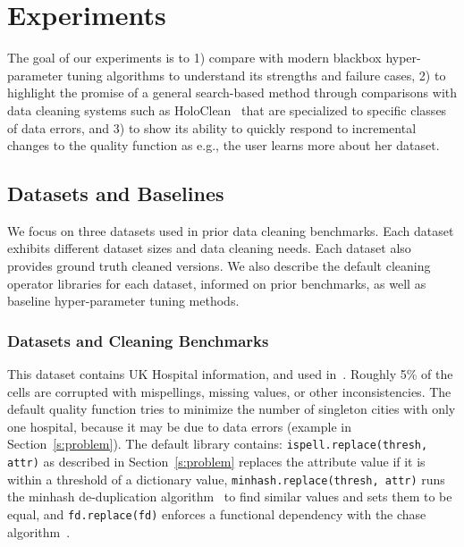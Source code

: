 \section{Experiments}\label{s:exp}
The goal of our experiments is to 1) compare \sys with modern blackbox hyper-parameter tuning algorithms to understand its strengths and failure cases, 2) to highlight the promise of a general search-based method through comparisons with data cleaning systems such as HoloClean~\cite{rekatsinas2017holoclean} that are specialized to specific classes of data errors, and 3) to show its ability to quickly respond to incremental changes to the quality function as e.g., the user learns more about her dataset.   




\subsection{Datasets and Baselines}
We focus on three datasets used in prior data cleaning benchmarks.  Each dataset exhibits different dataset sizes and data cleaning needs. Each dataset also provides ground truth cleaned versions. We also describe the default cleaning operator libraries for each dataset, informed on prior benchmarks, as well as baseline hyper-parameter tuning methods.

\subsubsection{Datasets and Cleaning Benchmarks}


 This dataset contains UK Hospital information, and used in~\cite{he2016interactive, rekatsinas2017holoclean}.  Roughly 5\% of the cells are corrupted with mispellings, missing values, or other inconsistencies.  The default quality function tries to minimize the number of singleton cities with only one hospital, because it may be due to data errors (example in Section~\ref{s:problem}).  The default library contains: \texttt{ispell.replace(thresh, attr)} as described in Section~\ref{s:problem} replaces the attribute value if it is within a threshold of a dictionary value, \texttt{minhash.replace(thresh, attr)} runs the minhash de-duplication algorithm~\cite{broder2000min} to find similar values and sets them to be equal, and \texttt{fd.replace(fd)} enforces a functional dependency with the chase algorithm~\cite{aho1979theory}.

